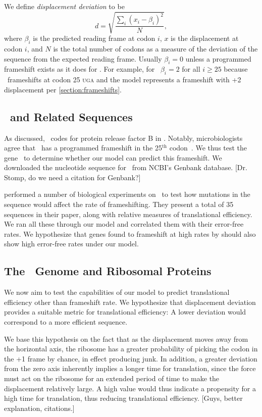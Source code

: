 \documentclass[12pt]{article}
\numberwithin{equation}{section}
\begin{document}
We define \emph{displacement deviation} to be
\begin{equation}
    d = \sqrt{\frac{\sum_i \left(x_i - \beta_i\right)^2}{N}},
\end{equation}
where $\beta_i$ is the predicted reading frame at codon $i$, $x$ is
the displacement at codon $i$, and $N$ is the total number of codons
as a measure of the deviation of the sequence from the expected
reading frame.  Usually $\beta_i = 0$ unless a programmed frameshift
exists as it does for \prfB.  For example, for \prfB\ $\beta_i = 2$
for all $i \geq 25$ because \prfB\ frameshifts at codon 25
\textsc{uga} and the model represents a frameshift with +2
displacement per \autoref{section:frameshifts}.

\subsection{\prfB\ and Related Sequences}
As discussed, \prfB\ codes for protein release factor B in \ecoli.
Notably, microbiologists agree that \prfB\ has a programmed frameshift
in the 25$^\textrm{th}$ codon~\cite{weiss87}.  We thus test the
gene \prfB\ to determine whether our model can predict this
frameshift.  We downloaded the nucleotide sequence for \prfB\ from
NCBI's Genbank database.  [Dr. Stomp, do we need a citation for Genbank?]

\citet{weiss87} performed a number of biological experiments on
\prfB\ to test how mutations in the sequence would affect the rate of
frameshifting.  They present a total of 35 sequences in their paper,
along with relative measures of translational efficiency.  We ran all
these through our model and correlated them with their error-free rates.
We hypothesize that genes found to frameshift at high rates by
\citeauthor{weiss87} should also show high error-free rates under
our model.

\subsection{The \ecoli\ Genome and Ribosomal Proteins}
We now aim to test the capabilities of our model to predict translational
efficiency other than frameshift rate.  We hypothesize that displacement
deviation provides a suitable metric for translational efficiency:  A lower
deviation would correspond to a more efficient sequence.  

We base this 
hypothesis on the fact that as the displacement moves away from the 
horizontal axis, the ribosome has a greater probability of picking the
codon in the +1 frame by chance, in effect producing junk.  In addition,
a greater deviation from the zero axis inherently implies a longer
time for translation, since the force must act on the ribosome for an 
extended period of time to make the displacement relatively large.  A
high value would thus indicate a propensity for a high time for translation,
thus reducing translational efficiency.  [Guys, better explanation, citations.]
\end{document}
